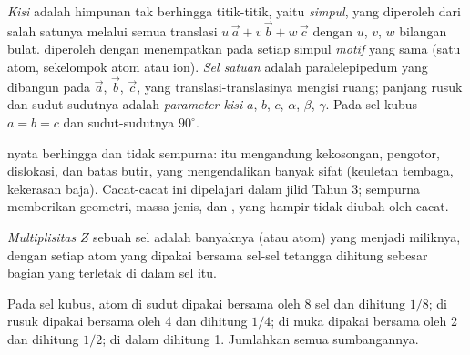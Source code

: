 \begin{definition}\label{def:b1:crystals-metals:lattice}
\emph{Kisi} adalah himpunan tak berhingga titik-titik, yaitu
\emph{simpul}, yang diperoleh dari salah satunya melalui
semua translasi $u\,\vec a + v\,\vec b + w\,\vec c$ dengan $u$, $v$,
$w$ bilangan bulat.  diperoleh dengan menempatkan pada setiap
simpul \emph{motif} yang sama (satu atom, sekelompok atom
atau ion). \emph{Sel satuan} adalah paralelepipedum
yang dibangun pada $\vec a$, $\vec b$, $\vec c$, yang translasi-translasinya
mengisi ruang; panjang rusuk dan sudut-sudutnya adalah \emph{parameter
kisi} $a$, $b$, $c$, $\alpha$, $\beta$, $\gamma$.
Pada sel kubus $a = b = c$ dan sudut-sudutnya $90^\circ$.
\end{definition}

\begin{remark}\label{rem:b1:crystals-metals:real}
 nyata berhingga dan tidak sempurna:  itu mengandung
kekosongan, pengotor, dislokasi, dan batas butir, yang mengendalikan
banyak sifat (keuletan tembaga, kekerasan baja). Cacat-cacat ini
dipelajari dalam jilid Tahun 3;  sempurna memberikan geometri,
massa jenis, dan , yang hampir tidak diubah oleh cacat.
\end{remark}

\begin{definition}\label{def:b1:crystals-metals:multiplicity}
\emph{Multiplisitas} $Z$ sebuah sel adalah banyaknya
 (atau atom) yang menjadi miliknya, dengan setiap atom yang dipakai
bersama sel-sel tetangga dihitung sebesar bagian yang terletak di dalam
sel itu.
\end{definition}

\begin{method}\label{met:b1:crystals-metals:count}
Pada sel kubus, atom di sudut dipakai bersama oleh 8 sel dan dihitung
$1/8$; di rusuk dipakai bersama oleh 4 dan dihitung $1/4$; di muka
dipakai bersama oleh 2 dan dihitung $1/2$; di dalam dihitung 1.
Jumlahkan semua sumbangannya.
\end{method}

